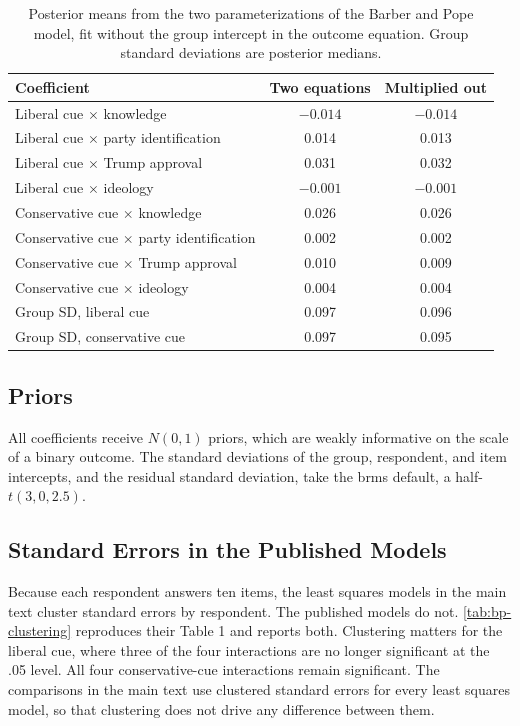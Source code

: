 \documentclass[12pt]{article}
\begin{document}
\begin{table}[htpb]
\begin{center}
\begin{tabular}{lcc}
\hline
Coefficient & Two equations & Multiplied out \\
\hline
Liberal cue $\times$ knowledge & $-0.014$ & $-0.014$ \\
Liberal cue $\times$ party identification & 0.014 & 0.013 \\
Liberal cue $\times$ Trump approval & 0.031 & 0.032 \\
Liberal cue $\times$ ideology & $-0.001$ & $-0.001$ \\
Conservative cue $\times$ knowledge & 0.026 & 0.026 \\
Conservative cue $\times$ party identification & 0.002 & 0.002 \\
Conservative cue $\times$ Trump approval & 0.010 & 0.009 \\
Conservative cue $\times$ ideology & 0.004 & 0.004 \\
Group SD, liberal cue & 0.097 & 0.096 \\
Group SD, conservative cue & 0.097 & 0.095 \\
\hline
\end{tabular}
\caption{Posterior means from the two parameterizations of the Barber and Pope model, fit without the group intercept in the outcome equation. Group standard deviations are posterior medians.}
\label{tab:bp-equivalence}
\end{center}
\end{table}

\subsection{Priors}

All coefficients receive $N(0, 1)$ priors, which are weakly informative on the scale of a binary outcome.
The standard deviations of the group, respondent, and item intercepts, and the residual standard deviation, take the brms default, a half-$t(3, 0, 2.5)$.

\subsection{Standard Errors in the Published Models}

Because each respondent answers ten items, the least squares models in the main text cluster standard errors by respondent.
The published models do not.
\autoref{tab:bp-clustering} reproduces their Table 1 and reports both.
Clustering matters for the liberal cue, where three of the four interactions are no longer significant at the .05 level. All four conservative-cue interactions remain significant.
The comparisons in the main text use clustered standard errors for every least squares model, so that clustering does not drive any difference between them.
\end{document}
